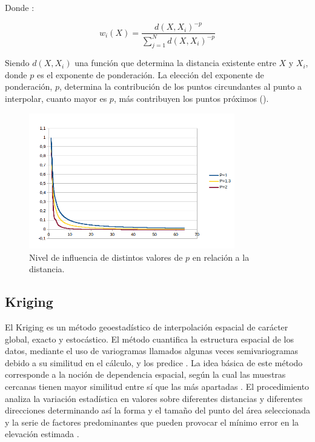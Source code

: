 Donde :

\begin{equation}
w_i(X) =  \dfrac{d(X, X_i)^{-p}}{\sum_{j=1}^{N} d(X, X_i)^{-p}}
\end{equation}


Siendo $d(X, X_i)$ una función que determina la distancia existente entre $X$ y $X_{i}$, donde $p$
es el exponente de ponderación. La elección del exponente de ponderación, $p$, determina la
contribución de los puntos circundantes al punto a interpolar, cuanto mayor es $p$, más
contribuyen los puntos próximos ().

\begin{figure}[!htbp]
\centering
\includegraphics[width=0.8\textwidth]{capitulo-2/graphics/idw-parametros.png}
\caption{\label{fig:sig-idw-parametros} Nivel de influencia de distintos valores de $p$ en
relación a la distancia.}

\end{figure}

\subsection{Kriging}
El Kriging es un método geoestadístico de interpolación espacial de carácter global, exacto y
estocástico\citep{NINO2011}. El método cuantifica la estructura espacial de los datos, mediante el
uso de variogramas llamados algunas veces semivariogramas debido a su similitud en el cálculo, y
los predice \citep{villatoro2007comparacion}. La idea básica de este método corresponde a la
noción de dependencia espacial, según la cual las muestras cercanas tienen mayor similitud entre
sí que las más apartadas \citep{NINO2011}. El procedimiento analiza la variación estadística en
valores sobre diferentes distancias y diferentes direcciones determinando así la forma y el tamaño
del punto del área seleccionada y la serie de factores predominantes que pueden provocar el mínimo
error en la elevación estimada \citep{cPachecoMDE2003}.

